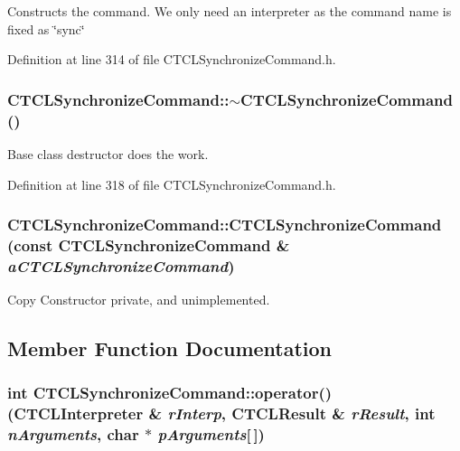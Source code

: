 Constructs the command. We only need an interpreter as the command name is fixed as \char`\"{}sync\char`\"{} 

Definition at line 314 of file CTCLSynchronize\-Command.h.
\subsubsection{\setlength{\rightskip}{0pt plus 5cm}CTCLSynchronize\-Command::$\sim$CTCLSynchronize\-Command ()\hspace{0.3cm}{\tt  [inline]}}\label{classCTCLSynchronizeCommand_a1}


Base class destructor does the work.



Definition at line 318 of file CTCLSynchronize\-Command.h.
\subsubsection{\setlength{\rightskip}{0pt plus 5cm}CTCLSynchronize\-Command::CTCLSynchronize\-Command (const CTCLSynchronize\-Command \& {\em a\-CTCLSynchronize\-Command})\hspace{0.3cm}{\tt  [private]}}\label{classCTCLSynchronizeCommand_c0}


Copy Constructor private, and unimplemented.



\subsection{Member Function Documentation}
\subsubsection{\setlength{\rightskip}{0pt plus 5cm}int CTCLSynchronize\-Command::operator() ({\bf CTCLInterpreter} \& {\em r\-Interp}, {\bf CTCLResult} \& {\em r\-Result}, int {\em n\-Arguments}, char $\ast$ {\em p\-Arguments}[$\,$])\hspace{0.3cm}{\tt  [virtual]}}\label{classCTCLSynchronizeCommand_a3}


